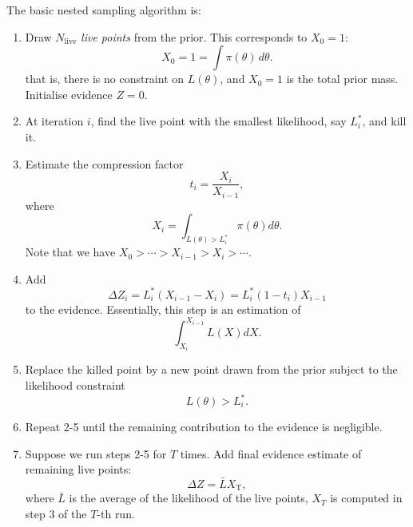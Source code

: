 \documentclass[11pt, titlepage]{article} %
\numberwithin{equation}{section}
\theoremstyle{definition}
\numberwithin{assumption}{section}
\begin{document}
The basic nested sampling algorithm is:

\begin{enumerate}
    \item Draw $N_{\mathrm{live}}$ \textit{live points} from the prior. This corresponds to $X_0=1$:
    \begin{equation*}
        X_0=1=\int\pi(\theta)\,d\theta.
    \end{equation*}
    that is, there is no constraint on $L(\theta)$, and $X_0=1$ is the total prior mass. Initialise evidence $Z=0$.


    
    \item At iteration $i$, find the live point with the smallest likelihood, say $L_i^*$, and kill it.
    \item Estimate the compression factor
    \begin{equation*}
        t_i=\frac{X_i}{X_{i-1}},
    \end{equation*}
    where
    \begin{equation*}
        X_i = \int_{L(\theta)>L^*_i}\pi(\theta) d\theta.
    \end{equation*}
    Note that we have $X_0>\cdots>X_{i-1}>X_i>\cdots$.
    \item Add 
    \begin{equation*}
        \Delta Z_i = L_i^*(X_{i-1}-X_i)=L^*_i(1-t_i)X_{i-1}
    \end{equation*}
    to the evidence. Essentially, this step is an estimation of
    \begin{equation*}
        \int_{X_{i}}^{X_{i-1}}L(X)dX.
    \end{equation*}
    \item Replace the killed point by a new point drawn from the prior subject to the likelihood constraint
    \begin{equation*}
        L(\theta)>L_i^*.
    \end{equation*}
    \item Repeat 2-5 until the remaining contribution to the evidence is negligible.
    \item Suppose we run steps 2-5 for $T$ times. Add final evidence estimate of remaining live points:
    \begin{equation*}
        \Delta Z=\bar LX_{\mathrm{T}},
    \end{equation*}
    where $\bar L$ is the average of the likelihood of the live points, $X_T$ is computed in step 3 of the $T$-th run. 
\end{enumerate}
\end{document}
